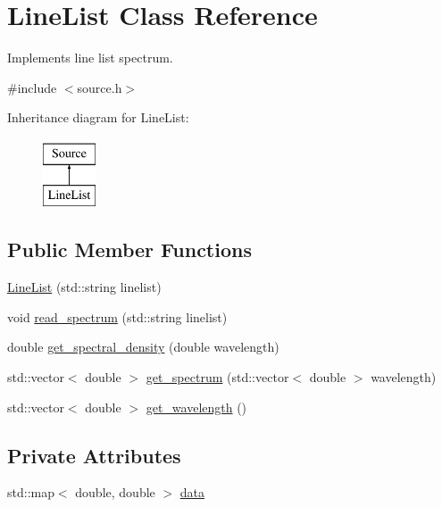 \hypertarget{class_line_list}{}\section{Line\+List Class Reference}
\label{class_line_list}


Implements line list spectrum.  




{\ttfamily \#include $<$source.\+h$>$}

Inheritance diagram for Line\+List\+:\begin{figure}[H]
\begin{center}
\leavevmode
\includegraphics[height=2.000000cm]{class_line_list}
\end{center}
\end{figure}
\subsection*{Public Member Functions}
\begin{DoxyCompactItemize}
\item 
\hyperlink{class_line_list_aa2d1b522deec10a431ad6eacc4c614fd}{Line\+List} (std\+::string linelist)
\item 
void \hyperlink{class_line_list_a24602f1ed3e346d6c06e788d00dae6e8}{read\+\_\+spectrum} (std\+::string linelist)
\item 
double \hyperlink{class_line_list_acb1e41d6120cf6bc0df2afaeb35a5aad}{get\+\_\+spectral\+\_\+density} (double wavelength)
\item 
std\+::vector$<$ double $>$ \hyperlink{class_line_list_aa51704a60f48389c06c583d2a4cc6733}{get\+\_\+spectrum} (std\+::vector$<$ double $>$ wavelength)
\item 
std\+::vector$<$ double $>$ \hyperlink{class_line_list_acfc2f92ac90099e4d4a2d3f2fcac47ef}{get\+\_\+wavelength} ()
\end{DoxyCompactItemize}
\subsection*{Private Attributes}
\begin{DoxyCompactItemize}
\item 
std\+::map$<$ double, double $>$ \hyperlink{class_line_list_af8d4ea58795d9cc4687a21884f2953b3}{data}
\end{DoxyCompactItemize}


